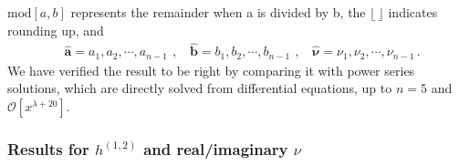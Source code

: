 \documentclass[a4paper,11pt]{article}
\begin{document}
$\text{mod}[a,b]$ represents the remainder when a is divided by b, the  $\lfloor ~  \rfloor$  indicates rounding up, and
\begin{align}
&\hat{\bm{a}}=a_1,a_2,\cdots,a_{n-1} \, ~,~~~~\hat{\bm{b}}=b_1,b_2,\cdots,b_{n-1} \, ~ ,~~~~  \hat{\bm{\nu}}=\nu_1,\nu_2,\cdots,\nu_{n-1} \, .
\end{align}
We have verified the result to be right by comparing it with power series solutions, which are directly solved from differential equations, up to $n=5$ and $\mathcal{O}[x^{\lambda+20}]$.



\subsubsection{Results for $h^{(1,2)}$ and real/imaginary $\nu$} \label{sec:generalC}
\end{document}
